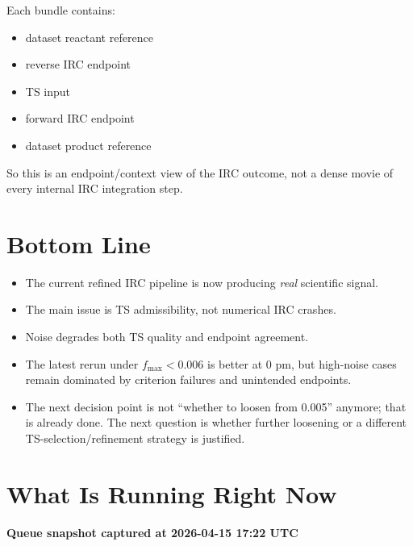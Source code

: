 \documentclass[11pt]{article}
\begin{document}
Each bundle contains:
\begin{itemize}[nosep,leftmargin=1.5em]
\item dataset reactant reference
\item reverse IRC endpoint
\item TS input
\item forward IRC endpoint
\item dataset product reference
\end{itemize}

So this is an endpoint/context view of the IRC outcome, not a dense movie of every
internal IRC integration step.

\section*{Bottom Line}

\begin{itemize}[nosep,leftmargin=1.5em]
\item The current refined IRC pipeline is now producing \emph{real} scientific signal.
\item The main issue is TS admissibility, not numerical IRC crashes.
\item Noise degrades both TS quality and endpoint agreement.
\item The latest rerun under \(f_{\max}<0.006\) is better at 0 pm, but high-noise
      cases remain dominated by criterion failures and unintended endpoints.
\item The next decision point is not ``whether to loosen from 0.005'' anymore;
      that is already done. The next question is whether further loosening or a
      different TS-selection/refinement strategy is justified.
\end{itemize}

\section*{What Is Running Right Now}

\textbf{Queue snapshot captured at 2026-04-15 17:22 UTC}
\end{document}
